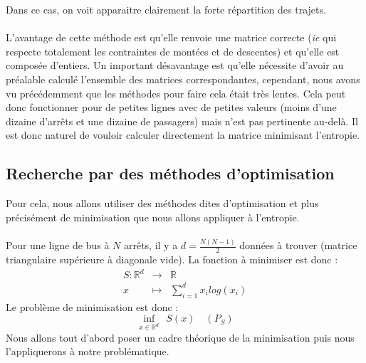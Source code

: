 \documentclass[12pt]{article}
\newcommand{\R}{\mathbb{R}}
\begin{document}
Dans ce cas, on voit apparaitre clairement la forte répartition des trajets.\\
\\
L'avantage de cette méthode est qu'elle renvoie une matrice correcte (\textit{ie} qui respecte totalement les contraintes de montées et de descentes) et qu'elle est composée d'entiers. Un important désavantage est qu'elle nécessite d'avoir au préalable calculé l'ensemble des matrices correspondantes, cependant, nous avons vu précédemment que les méthodes pour faire cela était très lentes. Cela peut donc fonctionner pour de petites lignes avec de petites valeurs (moins d'une dizaine d'arrêts et une dizaine de passagers) mais n'est pas pertinente au-delà. Il est donc naturel de vouloir calculer directement la matrice minimisant l'entropie.
\subsection{Recherche par des méthodes d'optimisation}
Pour cela, nous allons utiliser des méthodes dites d'optimisation et plus précisément de minimisation que nous allons appliquer à l'entropie.\\
\\
Pour une ligne de bus à $N$ arrêts, il y a $d = \frac{N(N-1)}{2}$ données à trouver (matrice triangulaire supérieure à diagonale vide). La fonction à minimiser est donc :
\[\begin{array}{rcl}
S:\R^d&\to& \R\\
x &\mapsto &\sum_{i=1}^d x_ilog(x_i)
\end{array}
\]
Le problème de minimisation est donc :
\[
\inf_{x\in \R^d} \: \: S(x) \quad (P_S)
\]
Nous allons tout d'abord poser un cadre théorique de la minimisation puis nous l'appliquerons à notre problématique.
\end{document}

